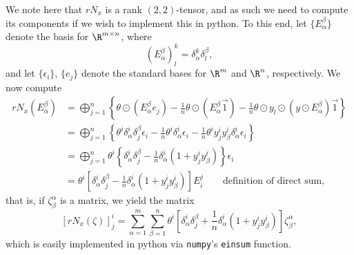 We note here that $rN_x$ is a rank $(2,2)$-tensor, and as such we need to compute its components if we wish to implement this in python.  To this end, let $\{E_\alpha^\beta\}$ denote the basis for $\R^{m\times n}$, where
$$(E^\beta_\alpha)^k_l=\delta^k_\alpha\delta_l^\beta,$$
and let $\{\epsilon_i\}$, $\{e_j\}$ denote the standard bases for $\R^m$ and $\R^n$, respectively.  We now compute
\begin{align*}
	rN_x(E_\alpha^\beta)&=\bigoplus_{j=1}^n\left\{\theta\odot(E_\alpha^\beta e_j)-\frac{1}{n}\theta\odot(E_\alpha^\beta\vec{1})-\frac{1}{n}\theta\odot y_l\odot(y\odot E_\alpha^\beta)\vec{1}\right\}\\
	&=\bigoplus_{j=1}^n\left\{\theta^i\delta_\alpha^i\delta_j^\beta\epsilon_i-\frac{1}{n}\theta^i\delta^i_\alpha\epsilon_i-\frac{1}{n}\theta^iy^i_jy^i_\beta\delta^i_\alpha\epsilon_i\right\}\\
	&=\bigoplus_{j=1}^n\theta^i\left\{\delta_\alpha^i\delta_j^\beta-\frac{1}{n}\delta_\alpha^i(1+y_j^iy_\beta^i)\right\}\epsilon_i\\
	&=\theta^i\left[\delta_\alpha^i\delta_j^\beta-\frac{1}{n}\delta_\alpha^i(1+y_j^iy_\beta^i)\right]E_i^j\qquad\text{definition of direct sum},
\end{align*}
that is, if $\zeta^\alpha_\beta$ is a matrix, we yield the matrix
$$[rN_x(\zeta)]^i_j=\sum_{\alpha=1}^m\sum_{\beta=1}^n
	\theta^i[\delta_\alpha^i\delta_j^\beta+\frac{1}{n}\delta_\alpha^i(1+y_j^iy_\beta^i)]\zeta^\alpha_\beta,$$
which is easily implemented in python via \texttt{numpy}'s \texttt{einsum} function.

